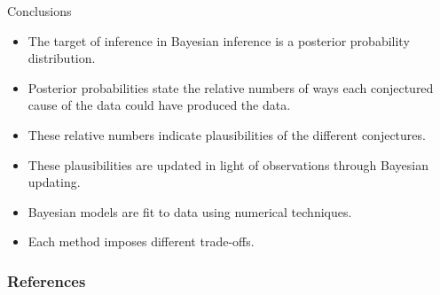 \documentclass[handout]{beamer}
\begin{document}
\begin{frame}{Conclusions}
\scriptsize{

\begin{itemize}
\item The target of inference in Bayesian inference is a posterior probability distribution.\item Posterior probabilities state the relative numbers of ways each conjectured cause of the data could have produced the data. 
\item These relative numbers indicate plausibilities of the different conjectures.
\item These plausibilities are updated in light of observations through Bayesian updating.
\item Bayesian models are fit to data using numerical techniques.
\item Each method imposes different trade-offs.

\end{itemize}


} 
\end{frame}


\begin{frame}[allowframebreaks]\scriptsize
\frametitle{References}


%
\end{frame}  









\end{document}
